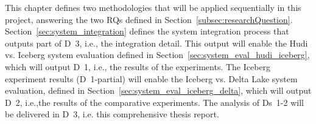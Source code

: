 This chapter defines two methodologies that will be applied sequentially in this project, answering the two \glspl{RQ} defined in Section~\ref{subsec:researchQuestion}. Section~\ref{sec:system_integration} defines the system integration process that outputs part of \gls{D}~3, i.e., the integration detail. This output will enable the Hudi vs. Iceberg system evaluation defined in Section~\ref{sec:system_eval_hudi_iceberg}, which will output \gls{D}~1, i.e., the results of the experiments. The Iceberg experiment results (\gls{D}~1-partial) will enable the Iceberg vs. Delta Lake system evaluation, defined in Section~\ref{sec:system_eval_iceberg_delta}, which will output \gls{D}~2, i.e.,the results of the comparative experiments. The analysis of \glspl{D}~1-2 will be delivered in \gls{D}~3, i.e. this comprehensive thesis report.